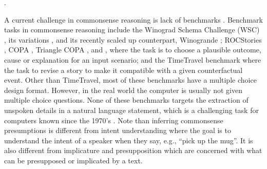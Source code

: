 \citep{azaria2016instructable,labutov2018lia,srivastava2018teaching,goldwasser2014learning,christmann2019look,guo2018dialog,li2018appinite,li2017programming,li2017sugilite}.

A current challenge in commonsense reasoning is lack of benchmarks \cite{davis2015commonsense}. Benchmark tasks in commonsense reasoning include the Winograd Schema Challenge (WSC) \cite{levesque2012winograd}, its variations \cite{kocijan2020review}, and its recently scaled up counterpart, Winogrande \cite{sakaguchi2019winogrande} 
; ROCStories \cite{mostafazadeh2017lsdsem}, COPA \cite{roemmele2011choice}, Triangle COPA \cite{maslan2015one}, and {\art} \cite{bhagavatula2019abductive}, where the task is to choose a plausible outcome, cause or explanation for an input scenario; and the TimeTravel benchmark \cite{qin2019counterfactual} where the task to revise a story to make
it compatible with a given counterfactual
event. 
Other than TimeTravel, most of these benchmarks have a multiple choice design format. 
However, in the real world the computer is usually not given multiple choice questions.
None of these benchmarks targets the extraction of unspoken details in a natural language statement, which is a challenging task for computers known since the 1970's \cite{grice1975logic}. Note than inferring commonsense presumptions is different from intent understanding \cite{janivcek2010abductive,tur2011spoken} where the goal is to understand the intent of a speaker when they say, e.g., ``pick up the mug''. It is also different from implicature and presupposition \cite{sbisa1999presupposition,simons2013conversational,sakama2016abduction} which are concerned with what can be presupposed or implicated by a text.
